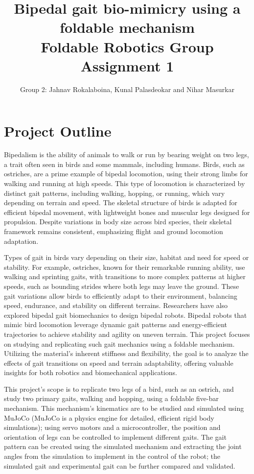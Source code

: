 \documentclass[12pt]{article}
\begin{document}
\title{Bipedal gait bio-mimicry using a foldable mechanism\\ \small Foldable Robotics Group Assignment 1}
\date{}
\author{Group 2: Jahnav Rokalaboina, Kunal Palasdeokar and Nihar Masurkar}

\maketitle

\section*{Project Outline }
Bipedalism is the ability of animals to walk or run by bearing weight on two legs, a trait often seen in birds and some mammals, including humans. Birds, such as ostriches, are a prime example of bipedal locomotion, using their strong limbs for walking and running at high speeds. This type of locomotion is characterized by distinct gait patterns, including walking, hopping, or running, which vary depending on terrain and speed. The skeletal structure of birds is adapted for efficient bipedal movement, with lightweight bones and muscular legs designed for propulsion. Despite variations in body size across bird species, their skeletal framework remains consistent, emphasizing flight and ground locomotion adaptation.

Types of gait in birds vary depending on their size, habitat and need for speed or stability. For example, ostriches, known for their remarkable running ability, use walking and sprinting gaits, with transitions to more complex patterns at higher speeds, such as bounding strides where both legs may leave the ground. These gait variations allow birds to efficiently adapt to their environment, balancing speed, endurance, and stability on different terrains. Researchers have also explored bipedal gait biomechanics to design bipedal robots. Bipedal robots that mimic bird locomotion leverage dynamic gait patterns and energy-efficient trajectories to achieve stability and agility on uneven terrain. This project focuses on studying and replicating such gait mechanics using a foldable mechanism. Utilizing the material's inherent stiffness and flexibility, the goal is to analyze the effects of gait transitions on speed and terrain adaptability, offering valuable insights for both robotics and biomechanical applications.

This project's scope is to replicate two legs of a bird, such as an ostrich, and study two primary gaits, walking and hopping, using a foldable five-bar mechanism. This mechanism’s kinematics are to be studied and simulated using MuJoCo (MuJoCo is a physics engine for detailed, efficient rigid body simulations); using servo motors and a microcontroller, the position and orientation of legs can be controlled to implement different gaits. The gait pattern can be created using the simulated mechanism and extracting the joint angles from the simulation to implement in the control of the robot; the simulated gait and experimental gait can be further compared and validated.
\end{document}
